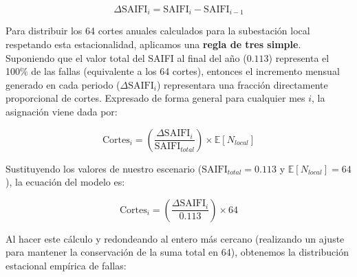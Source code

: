 \documentclass[
  spanish,
  letterpaper,
  DIV=11,
  numbers=noendperiod]{scrreprt}
\theoremstyle{plain}
\theoremstyle{definition}
\theoremstyle{remark}
\begin{document}
\[
\Delta \text{SAIFI}_i = \text{SAIFI}_i - \text{SAIFI}_{i-1}
\]

Para distribuir los 64 cortes anuales calculados para la subestación
local respetando esta estacionalidad, aplicamos una \textbf{regla de
tres simple}. Suponiendo que el valor total del SAIFI al final del año
(\(0.113\)) representa el 100\% de las fallas (equivalente a los 64
cortes), entonces el incremento mensual generado en cada periodo
(\(\Delta \text{SAIFI}_i\)) representara una fracción directamente
proporcional de cortes. Expresado de forma general para cualquier mes
\(i\), la asignación viene dada por:

\[
\text{Cortes}_i = \left( \frac{\Delta \text{SAIFI}_i}{\text{SAIFI}_{total}} \right) \times \mathbb{E}[N_{local}]
\]

Sustituyendo los valores de nuestro escenario
(\(\text{SAIFI}_{total} = 0.113\) y \(\mathbb{E}[N_{local}] = 64\)), la
ecuación del modelo es:

\[
\text{Cortes}_i = \left( \frac{\Delta \text{SAIFI}_i}{0.113} \right) \times 64
\]

Al hacer este cálculo y redondeando al entero más cercano (realizando un
ajuste para mantener la conservación de la suma total en 64), obtenemos
la distribución estacional empírica de fallas:
\end{document}
